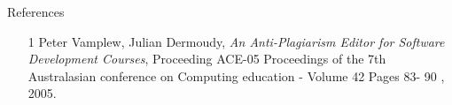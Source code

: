\documentclass[color=usenames,dvipsnames]{beamer}
\begin{document}
\begin{frame}{References}

\begin{itemize}

  \setlength{\itemsep}{20pt}

\fontsize{.25cm}{1em}\selectfont

\item  [1]	Peter Vamplew, Julian Dermoudy, \emph{An Anti-Plagiarism Editor for Software Development Courses}, Proceeding ACE-05 Proceedings of the 7th
Australasian conference on Computing education - Volume 42 Pages 83-
90 , 2005.

\end{itemize}

\end{frame}
\end{document}
